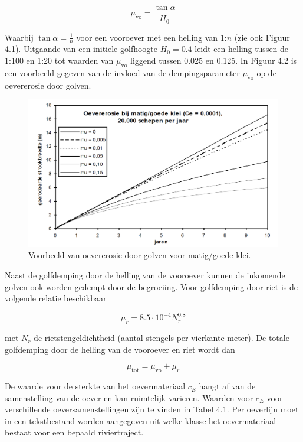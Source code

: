 \begin{equation}
\mu_\text{vo} = \frac{\tan \alpha}{H_0}
\end{equation}

Waarbij $\tan \alpha = \frac{1}{n}$ voor een vooroever met een helling van 1:$n$ (zie ook Figuur 4.1).
Uitgaande van een initiele golfhoogte $H_0 = 0.4$ leidt een helling tussen de 1:100 en 1:20 tot waarden van $\mu_\text{vo}$ liggend tussen 0.025 en 0.125.
In Figuur 4.2 is een voorbeeld gegeven van de invloed van de dempingsparameter $\mu_\text{vo}$ op de oevererosie door golven.

\begin{figure}
\includegraphics[width=\textwidth]{figures/Fig4-2.png}
\caption{Voorbeeld van oevererosie door golven voor matig/goede klei.}
\label{Fig4.2}
\end{figure}

Naast de golfdemping door de helling van de vooroever kunnen de inkomende golven ook worden gedempt door de begroeiing.
Voor golfdemping door riet is de volgende relatie beschikbaar

\begin{equation}
\mu_r = 8.5 \cdot 10^{-4} N_r^{0.8}
\end{equation}

met $N_r$ de rietstengeldichtheid (aantal stengels per vierkante meter).
De totale golfdemping door de helling van de vooroever en riet wordt dan

\begin{equation}
\mu_\text{tot} = \mu_\text{vo} + \mu_r
\end{equation}

De waarde voor de sterkte van het oevermateriaal $c_E$ hangt af van de samenstelling van de oever en kan ruimtelijk varieren.
Waarden voor $c_E$ voor verschillende oeversamenstellingen zijn te vinden in Tabel 4.1.
Per oeverlijn moet in een tekstbestand worden aangegeven uit welke klasse het oevermateriaal bestaat voor een bepaald riviertraject.

